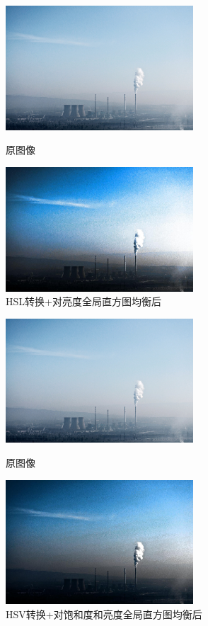 \documentclass[11pt, a4paper, UTF8]{ctexart}
\begin{document}
\begin{figure}[H]
  \centering
  \begin{minipage}[t]{0.48\textwidth}
  \centering
  \includegraphics[width=7cm]{color.jpg}
  \caption{原图像}
  \end{minipage}
  \begin{minipage}[t]{0.48\textwidth}
  \centering
  \includegraphics[width=7cm]{color_hsl_l_global_converted.jpg}
  \caption{HSL转换+对亮度全局直方图均衡后}
  \end{minipage}
\end{figure}


\begin{figure}[H]
  \centering
  \begin{minipage}[t]{0.48\textwidth}
  \centering
  \includegraphics[width=7cm]{color.jpg}
  \caption{原图像}
  \end{minipage}
  \begin{minipage}[t]{0.48\textwidth}
  \centering
  \includegraphics[width=7cm]{color_hsv_s+v_global_converted.jpg}
  \caption{HSV转换+对饱和度和亮度全局直方图均衡后}
  \end{minipage}
\end{figure}
\end{document}
